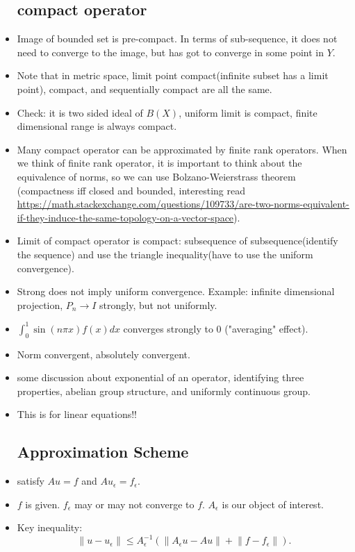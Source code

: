 \documentclass{article}
\theoremstyle{remark}
\begin{document}
\begin{itemize}
\subsection*{compact operator}
\item Image of bounded set is pre-compact. In terms of sub-sequence, it does not need to converge to the image, but has got to converge in some point in $Y$.
\item Note that in metric space, limit point compact(infinite subset has a limit point), compact, and sequentially compact are all the same.
\item Check: it is two sided ideal of $B(X)$, uniform limit is compact, finite dimensional range is always compact.
\item Many compact operator can be approximated by finite rank operators. When we think of finite rank operator, it is important to think about the equivalence of norms, so we can use Bolzano-Weierstrass theorem (compactness iff closed and bounded, interesting read \url{https://math.stackexchange.com/questions/109733/are-two-norms-equivalent-if-they-induce-the-same-topology-on-a-vector-space}).
\item Limit of compact operator is compact: subsequence of subsequence(identify the sequence) and use the triangle inequality(have to use the uniform convergence).
\item Strong does not imply uniform convergence. Example: infinite dimensional projection, $P_n\to I$ strongly, but not uniformly.
\item $\int_0^1 \sin(n\pi x)f(x)dx$ converges strongly to $0$ ("averaging" effect).
\item Norm convergent, absolutely convergent.
\item some discussion about exponential of an operator, identifying three properties, abelian group structure, and uniformly continuous group.
\item This is for linear equations!!
\subsection*{Approximation Scheme}
\item satisfy $Au=f$ and $Au_\epsilon=f_\epsilon$.
\item $f$ is given. $f_\epsilon$ may or may not converge to $f$. $A_\epsilon$ is our object of interest. 
\item Key inequality: $$\lVert u-u_\epsilon\rVert\leq A_\epsilon^{-1}(\lVert A_\epsilon u-Au\rVert +\lVert f-f_\epsilon\rVert).$$

\end{itemize}
\end{document}
